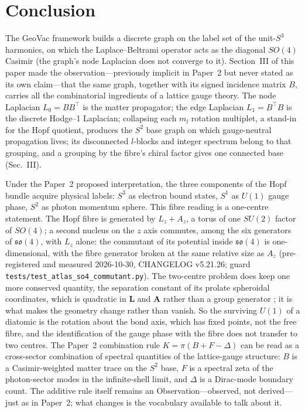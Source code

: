 \documentclass[aps,pra,twocolumn,superscriptaddress,longbibliography]{revtex4-2}
\begin{document}
\section{Conclusion}
\label{sec:conclusion}

The GeoVac framework builds a discrete graph on the label set of the
unit-$S^3$ harmonics, on which the Laplace--Beltrami operator acts as
the diagonal $SO(4)$ Casimir (the graph's node Laplacian does not
converge to it).  Section~III of this paper made the
observation---previously implicit in Paper~2 but never
stated as its own claim---that the same graph, together with its
signed incidence matrix $B$, carries all the combinatorial
ingredients of a lattice gauge theory.  The node Laplacian
$L_0 = B B^{\top}$ is the matter propagator; the edge Laplacian
$L_1 = B^{\top} B$ is the discrete Hodge--1 Laplacian; collapsing
each $m_l$ rotation multiplet, a stand-in for the Hopf quotient,
produces the $S^2$ base graph on which gauge-neutral propagation
lives; its disconnected $l$-blocks and integer spectrum belong to that
grouping, and a grouping by the fibre's chiral factor gives one
connected base (Sec.~III).

Under the Paper~2 proposed interpretation, the three components
of the Hopf bundle acquire physical labels: $S^3$ as electron bound
states, $S^1$ as $U(1)$ gauge phase, $S^2$ as photon momentum sphere.
This fibre reading is a one-centre statement.  The Hopf fibre is
generated by $L_z + A_z$, a torus of one $SU(2)$ factor of $SO(4)$; a
second nucleus on the $z$ axis commutes, among the six generators of
$\mathfrak{so}(4)$, with $L_z$ alone: the commutant of its potential
inside $\mathfrak{so}(4)$ is one-dimensional,
with the fibre generator broken at the same relative size as $A_z$
(pre-registered and measured 2026-10-30, CHANGELOG v5.21.26; guard
\texttt{tests/test\_atlas\_so4\_commutant.py}).  The two-centre problem
does keep one more conserved quantity, the separation constant of its
prolate spheroidal coordinates, which is quadratic in $\mathbf{L}$ and
$\mathbf{A}$ rather than a group generator \cite{coulson1967}; it is
what makes the geometry change rather than vanish.  So the surviving
$U(1)$ of a diatomic is the rotation about the bond axis, which has
fixed points, not the free fibre, and the identification of the gauge
phase with the fibre does not transfer to two centres.
The Paper~2 combination rule $K = \pi(B + F - \Delta)$ can be read as a
cross-sector combination of spectral quantities of the lattice-gauge structure:
$B$ is a Casimir-weighted matter trace on the $S^2$ base, $F$ is a
spectral zeta of the photon-sector modes in the infinite-shell
limit, and $\Delta$ is a Dirac-mode boundary count.  The additive
rule itself remains an Observation---observed, not derived---just as
in Paper~2; what changes
is the vocabulary available to talk about it.
\end{document}
